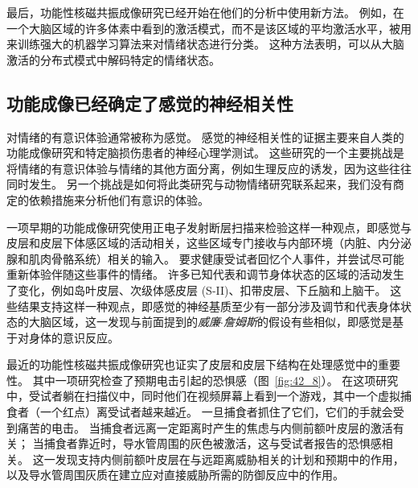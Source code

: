 最后，功能性核磁共振成像研究已经开始在他们的分析中使用新方法。
例如，在一个大脑区域的许多体素中看到的激活模式，而不是该区域的平均激活水平，被用来训练强大的机器学习算法来对情绪状态进行分类。
这种方法表明，可以从大脑激活的分布式模式中解码特定的情绪状态。



\subsection{功能成像已经确定了感觉的神经相关性}

对情绪的有意识体验通常被称为感觉。
感觉的神经相关性的证据主要来自人类的功能成像研究和特定脑损伤患者的神经心理学测试。
这些研究的一个主要挑战是将情绪的有意识体验与情绪的其他方面分离，例如生理反应的诱发，因为这些往往同时发生。
另一个挑战是如何将此类研究与动物情绪研究联系起来，我们没有商定的依赖措施来分析他们有意识的体验。


一项早期的功能成像研究使用正电子发射断层扫描来检验这样一种观点，即感觉与皮层和皮层下体感区域的活动相关，这些区域专门接收与内部环境（内脏、内分泌腺和肌肉骨骼系统）相关的输入。
要求健康受试者回忆个人事件，并尝试尽可能重新体验伴随这些事件的情绪。
许多已知代表和调节身体状态的区域的活动发生了变化，例如岛叶皮层、次级体感皮层 (S-II)、扣带皮层、下丘脑和上脑干。
这些结果支持这样一种观点，即感觉的神经基质至少有一部分涉及调节和代表身体状态的大脑区域，这一发现与前面提到的\textit{威廉$\cdot$詹姆斯}的假设有些相似，即感觉是基于对身体的意识反应。


最近的功能性核磁共振成像研究也证实了皮层和皮层下结构在处理感觉中的重要性。
其中一项研究检查了预期电击引起的恐惧感（图~\ref{fig:42_8}）。
在这项研究中，受试者躺在扫描仪中，同时他们在视频屏幕上看到一个游戏，其中一个虚拟捕食者（一个红点）离受试者越来越近。
一旦捕食者抓住了它们，它们的手就会受到痛苦的电击。
当捕食者远离一定距离时产生的焦虑与内侧前额叶皮层的激活有关；
当捕食者靠近时，导水管周围的灰色被激活，这与受试者报告的恐惧感相关。
这一发现支持内侧前额叶皮层在与远距离威胁相关的计划和预期中的作用，以及导水管周围灰质在建立应对直接威胁所需的防御反应中的作用。


